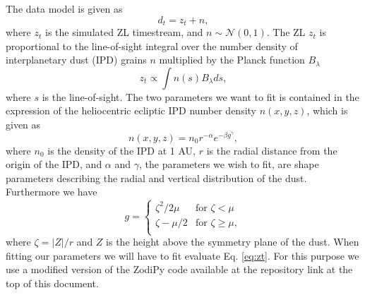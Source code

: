 \documentclass{article}
\begin{document}
The data model is given as
\begin{equation}
    d_t = z_t + n,
\end{equation}
where $z_t$ is the simulated ZL timestream, and $n \sim \mathcal{N}(0, 1)$. The ZL $z_t$ is proportional to the line-of-sight integral over the number density of interplanetary dust (IPD) grains $n$ multiplied by the Planck function $B_\lambda$
\begin{equation}\label{eq:zt}
    z_t \propto \int n(s) B_\lambda ds,
\end{equation}
where $s$ is the line-of-sight. The two parameters we want to fit is contained in the expression of the heliocentric ecliptic IPD number density $n(x,y,z)$, which is given as
\begin{equation}\label{eq:n}
    n(x,y,z) = n_0 r^{-\alpha} e^{ -\beta g^{\gamma}},
\end{equation}
where $n_0$ is the density of the IPD at 1 AU, $r$ is the radial distance from the origin of the IPD, and $\alpha$ and $\gamma$, the parameters we wish to fit, are shape parameters describing the radial and vertical distribution of the dust.
Furthermore we have
\begin{equation}\label{eq:g}
    g = \begin{cases}
        \zeta^2 / 2\mu & \text{for }  \zeta < \mu \\
        \zeta - \mu/2 & \text{for }  \zeta \geq \mu ,\\
    \end{cases}
\end{equation}
where $\zeta = |Z|/r$ and $Z$ is the height above the symmetry plane of the dust. When fitting our parameters we will have to fit evaluate Eq. \eqref{eq:zt}. For this purpose we use a modified version of the ZodiPy code available at the repository link at the top of this document.
\end{document}
